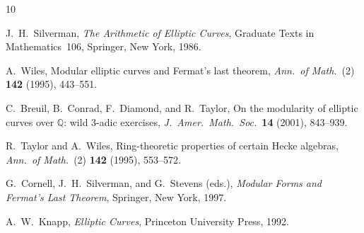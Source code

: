 \documentclass[12pt,a4paper]{amsart}
\theoremstyle{definition}
\newcommand{\Q}{\mathbb{Q}}
\begin{document}
\begin{thebibliography}{10}

J.~H.~Silverman,
\emph{The Arithmetic of Elliptic Curves},
Graduate Texts in Mathematics~106,
Springer, New York, 1986.

A.~Wiles,
Modular elliptic curves and Fermat's last theorem,
\emph{Ann.\ of Math.}\ (2) \textbf{142} (1995), 443--551.

C.~Breuil, B.~Conrad, F.~Diamond, and R.~Taylor,
On the modularity of elliptic curves over $\Q$:
wild $3$-adic exercises,
\emph{J.\ Amer.\ Math.\ Soc.}\ \textbf{14} (2001), 843--939.

R.~Taylor and A.~Wiles,
Ring-theoretic properties of certain Hecke algebras,
\emph{Ann.\ of Math.}\ (2) \textbf{142} (1995), 553--572.

G.~Cornell, J.~H.~Silverman, and G.~Stevens (eds.),
\emph{Modular Forms and Fermat's Last Theorem},
Springer, New York, 1997.

A.~W.~Knapp,
\emph{Elliptic Curves},
Princeton University Press, 1992.

\end{thebibliography}
\end{document}
